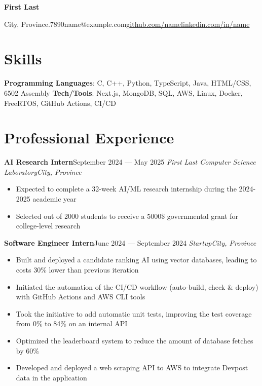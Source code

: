 \documentclass{article}
\newcommand{\cdelim}{\;\textbar\;}
\newcommand{\newrole}[4]{
    {\normalfont\textbf{#1}\hfill#3}
    \newline
    \textit{#2}\hfill\textit{#4}
}
\newenvironment{bulletpoints}{\begin{itemize}\setlength\itemsep{-0.2em}}{\end{itemize}}
\begin{document}
\begin{center}
    {\Huge\bfseries First Last}\\\vspace*{2pt}

    City, Province\cdelim 123.456.7890\cdelim name@example.com\cdelim\href{https://github.com/name}{github.com/name}\cdelim\href{https://linkedin.com/in/name}{linkedin.com/in/name}\\
\end{center}

\section*{Skills}

{\bfseries Programming Languages}: C, C++, Python, TypeScript, Java, HTML/CSS, 6502 Assembly
\newline
{\bfseries Tech/Tools}: Next.js, MongoDB, SQL, AWS, Linux, Docker, FreeRTOS, GitHub Actions, CI/CD


\section*{Professional Experience}

\newrole{AI Research Intern}{First Last Computer Science Laboratory}{September 2024 --- May 2025}{City, Province}
\begin{bulletpoints}
    \item Expected to complete a 32-week AI/ML research internship during the 2024-2025 academic year
    \item Selected out of 2000 students to receive a 5000\$ governmental grant for college-level research
\end{bulletpoints}

\newrole{Software Engineer Intern}{Startup}{June 2024 --- September 2024}{City, Province}
\begin{bulletpoints}
    \item Built and deployed a candidate ranking AI using vector databases, leading to costs 30\% lower than previous iteration
    \item Initiated the automation of the CI/CD workflow (auto-build, check \& deploy) with GitHub Actions and AWS CLI tools
    \item Took the initiative to add automatic unit tests, improving the test coverage from 0\% to 84\% on an internal API
    \item Optimized the leaderboard system to reduce the amount of database fetches by 60\%
    \item Developed and deployed a web scraping API to AWS to integrate Devpost data in the application
\end{bulletpoints}
\end{document}
